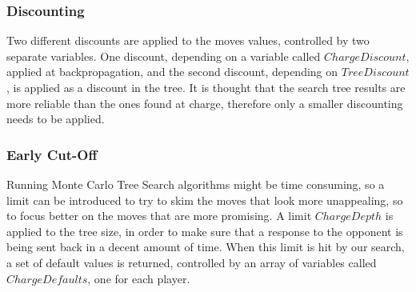 \subsubsection*{Discounting}
Two different discounts are applied to the moves values, controlled by two separate variables. One discount, depending on a variable called $ChargeDiscount$, applied at backpropagation, and the second discount, depending on $TreeDiscount$, is applied as a discount in the tree. It is thought that the search tree results are more reliable than the ones found at charge, therefore only a smaller discounting needs to be applied\cite{helgadottir2016virtual}.
\subsubsection*{Early Cut-Off}
Running Monte Carlo Tree Search algorithms might be time consuming, so a limit can be introduced to try to skim the moves that look more unappealing, so to focus better on the moves that are more promising\cite{finnsson2012generalized}. A limit $ChargeDepth$ is applied to the tree size, in order to make sure that a response to the opponent is being sent back in a decent amount of time. When this limit is hit by our search, a set of default values is returned, controlled by an array of variables called $ChargeDefaults$, one for each player\cite{helgadottir2016virtual}.
